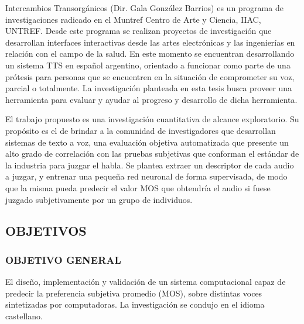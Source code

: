 Intercambios Transorgánicos (Dir. Gala González Barrios) es un programa de investigaciones radicado en el Muntref Centro de Arte y Ciencia, IIAC, UNTREF. Desde este programa se realizan proyectos de investigación que desarrollan interfaces interactivas desde las artes electrónicas y las ingenierías en relación con el campo de la salud. En este momento se encuentran desarrollando un sistema TTS en español argentino, orientado a funcionar como parte de una prótesis para personas que se encuentren en la situación de comprometer su voz, parcial o totalmente. La investigación planteada en esta tesis busca proveer una herramienta para evaluar y ayudar al progreso y desarrollo de dicha herramienta.

El trabajo propuesto es una investigación cuantitativa de alcance exploratorio. Su propósito es el de brindar a la comunidad de investigadores que desarrollan sistemas de texto a voz, una evaluación objetiva automatizada que presente un alto grado de correlación con las pruebas subjetivas que conforman el estándar de la industria para juzgar el habla. Se plantea extraer un descriptor de cada audio a juzgar, y entrenar una pequeña red neuronal de forma supervisada, de modo que la misma pueda predecir el valor MOS que obtendría el audio si fuese juzgado subjetivamente por un grupo de individuos.

\subsection{OBJETIVOS}
\subsubsection{OBJETIVO GENERAL}
El diseño, implementación y validación de un sistema computacional capaz de predecir la preferencia subjetiva promedio (MOS), sobre distintas voces sintetizadas por computadoras. La investigación se condujo en el idioma castellano.


